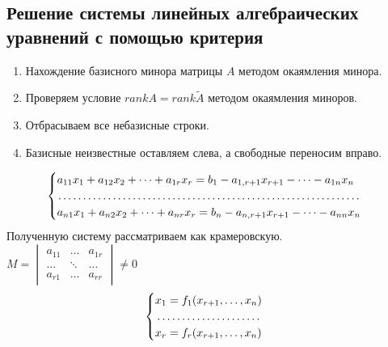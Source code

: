 \documentclass[a4paper, 12pt]{report}
\begin{document}
\subsection*{Решение системы линейных алгебраических уравнений с помощью критерия}
\begin{enumerate}
    \item Нахождение базисного минора матрицы $A$ методом окаямления минора.
    \item Проверяем условие $rankA=rank\widetilde{A}$ методом окаямления миноров.
    \item Отбрасываем все небазисные строки.
    \item Базисные неизвестные оставляем слева, а свободные переносим вправо.
\end{enumerate}
\begin{equation}
    \begin{cases}
    $$a_{11}x_1+a_{12}x_2+ \dots + a_{1r}x_r = b_1-a_{1, r+1}x_{r+1}- \dots -a_{1n}x_n$$\\
    $$\dotfill$$\\
    $$a_{n1}x_1+a_{n2}x_2+ \dots + a_{nr}x_r = b_n-a_{n, r+1}x_{r+1}- \dots -a_{nn}x_n$$
    \end{cases}
\end{equation}
Полученную систему рассматриваем как крамеровскую.\\
$M=
\begin{vmatrix}
a_{11} & \dots & a_{1r}\\
\dots & \ddots & \dots\\
a_{r1} & \dots & a_{rr}
\end{vmatrix} \neq 0$
\begin{equation*}
    \begin{cases}
    $$x_1=f_1(x_{r+1},\dots,x_n)$$\\
    \dotfill\\
    $$x_r=f_r(x_{r+1},\dots,x_n)$$
    \end{cases}
\end{equation*}
\end{document}
